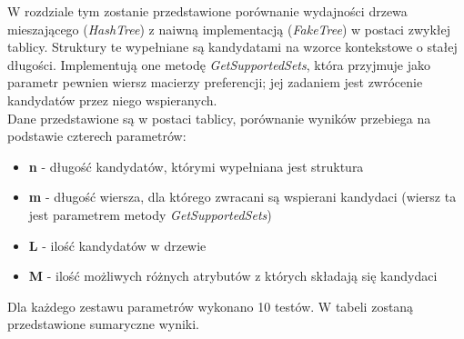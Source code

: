 \documentclass[a4paper,12pt]{article}
\begin{document}
W rozdziale tym zostanie przedstawione porównanie wydajności drzewa mieszającego (\textit{HashTree}) z naiwną implementacją (\textit{FakeTree}) w postaci zwykłej tablicy. Struktury te wypełniane są kandydatami na wzorce kontekstowe o stałej długości. Implementują one metodę \textit{GetSupportedSets}, która przyjmuje jako parametr pewnien wiersz macierzy preferencji; jej zadaniem jest zwrócenie kandydatów przez niego wspieranych. \\
Dane przedstawione są w postaci tablicy, porównanie wyników przebiega na podstawie czterech parametrów:
\begin{itemize}
\item {\bf n} - długość kandydatów, którymi wypełniana jest struktura
\item {\bf m} - długość wiersza, dla którego zwracani są wspierani kandydaci (wiersz ta jest parametrem metody \textit{GetSupportedSets})
\item {\bf L} - ilość kandydatów w drzewie
\item {\bf M} - ilość możliwych różnych atrybutów z których składają się kandydaci
\end{itemize}

Dla każdego zestawu parametrów wykonano 10 testów. W tabeli zostaną przedstawione sumaryczne wyniki. \\
\end{document}
